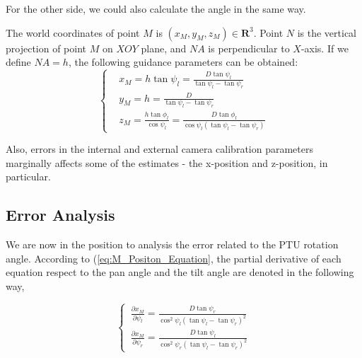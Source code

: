 \documentclass[journal,article,submit,moreauthors,pdftex,10pt,a4paper]{mdpi}
\begin{document}
For the other side, we could also calculate the angle in the same way. 

The world coordinates of point ${M}$ is $(x_M, y_M, z_M)\in \textbf{R}^3 $. Point $N$ is the vertical projection of point $M$ on $XOY$ plane, and $NA$ is perpendicular to $X$-axis. If we define $NA = h$, the following guidance parameters can be obtained:
\begin{equation}
\left \{
\begin{aligned}
&x_M = h \tan \psi_l = \frac{D\tan \psi_l}{\tan \psi_l - \tan \psi_r}            \\
&y_M = h = \frac{D}{\tan \psi_l - \tan \psi_r} \\
&z_M = \frac{h\tan \phi_l}{\cos \psi_l} = \frac{D\tan \phi_l}{\cos \psi_l(\tan \psi_l - \tan \psi_r)}
\end{aligned} \right.
\label{eq:M_Positon_Equation}
\end{equation} 


Also, errors in the internal and external camera calibration parameters marginally affects some of the estimates - the x-position and z-position, in particular.

\subsection{Error Analysis}
We are now in the position to analysis the error related to the PTU rotation angle. According to (\ref{eq:M_Positon_Equation}, the partial derivative of each equation respect to the pan angle and the tilt angle are denoted in the following way,

\begin{equation}
	\left\{ \,
	\begin{aligned}
		\frac{ \partial x_M}{ \partial \psi_l} = \frac{D \tan \psi_r}{ \cos^2 \psi_l (\tan \psi_l - \tan \psi_r)^2} \\
		\frac{ \partial x_M}{\partial \psi_r} = \frac{D \tan \psi_l}{\cos^2 \psi_r (\tan \psi_l - \tan \psi_r)^2} 
	\end{aligned}
	\right.
\end{equation}
\end{document}
